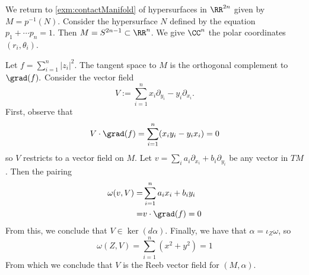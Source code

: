 

    We return to \cref{exm:contactManifold} of hypersurfaces in $\RR^{2n}$ given by $M=p^{-1}(N)$. 
    Consider the hypersurface $N$ defined by the equation $p_1+\cdots p_n=1$. Then $M=S^{2n-1}\subset \RR^n$.
    We give $\CC^n$ the polar coordinates $(r_i, \theta_i)$. 

    Let $f=\sum_{i=1}^n |z_i|^2.$ 
    The tangent space to $M$ is the orthogonal complement to $\grad(f).$ Consider the vector field 
    \[V:=\sum_{i=1}^n  x_i \partial_{y_i}- y_i \partial_{x_i}.\]
    First, observe that 
    \[V\cdot \grad(f)=\sum_{i=1}^n( x_i y_i - y_i x_i )= 0 \]
    so $V$ restricts to a vector field on $M$. 
    Let $v=\sum_{i}a_i \partial_{x_i}+b_i\partial_{y_i}$ be any vector in  $TM$. Then the pairing
    \begin{align*}
        \omega(v, V)=&\sum_{i=1}^n a_ix_i+b_iy_i\\
        =&v\cdot \grad(f)=0
    \end{align*}
    From this, we conclude that $V\in \ker(d\alpha)$.
    Finally, we have that $\alpha=\iota_Z\omega$, so 
    \[\omega(Z, V)=\sum_{i=1}^n (x^2+y^2)=1\]
    From which we conclude that $V$ is the Reeb vector field for $(M, \alpha)$.

